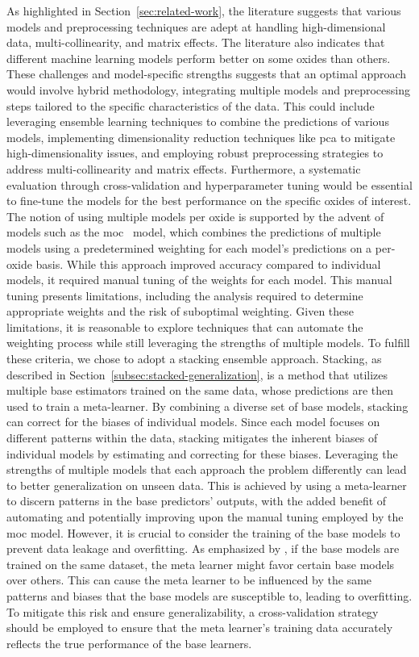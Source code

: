 As highlighted in Section~\ref{sec:related-work}, the literature suggests that various models and preprocessing techniques are adept at handling high-dimensional data, multi-collinearity, and matrix effects.
The literature also indicates that different machine learning models perform better on some oxides than others.
These challenges and model-specific strengths suggests that an optimal approach would involve hybrid methodology, integrating multiple models and preprocessing steps tailored to the specific characteristics of the data.
This could include leveraging ensemble learning techniques to combine the predictions of various models, implementing dimensionality reduction techniques like \gls{pca} to mitigate high-dimensionality issues, and employing robust preprocessing strategies to address multi-collinearity and matrix effects.
Furthermore, a systematic evaluation through cross-validation and hyperparameter tuning would be essential to fine-tune the models for the best performance on the specific oxides of interest.
The notion of using multiple models per oxide is supported by the advent of models such as the \gls{moc}~\cite{cleggRecalibrationMarsScience2017} model, which combines the predictions of multiple models using a predetermined weighting for each model's predictions on a per-oxide basis.
While this approach improved accuracy compared to individual models, it required manual tuning of the weights for each model.
This manual tuning presents limitations, including the analysis required to determine appropriate weights and the risk of suboptimal weighting.
Given these limitations, it is reasonable to explore techniques that can automate the weighting process while still leveraging the strengths of multiple models.
To fulfill these criteria, we chose to adopt a stacking ensemble approach.
Stacking, as described in Section~\ref{subsec:stacked-generalization}, is a method that utilizes multiple base estimators trained on the same data, whose predictions are then used to train a meta-learner.
By combining a diverse set of base models, stacking can correct for the biases of individual models.
Since each model focuses on different patterns within the data, stacking mitigates the inherent biases of individual models by estimating and correcting for these biases.
Leveraging the strengths of multiple models that each approach the problem differently can lead to better generalization on unseen data.
This is achieved by using a meta-learner to discern patterns in the base predictors' outputs\cite{wolpertstacked_1992, survey_of_ensemble_learning}, with the added benefit of automating and potentially improving upon the manual tuning employed by the \gls{moc} model.
However, it is crucial to consider the training of the base models to prevent data leakage and overfitting.
As emphasized by \citet{cvstacking}, if the base models are trained on the same dataset, the meta learner might favor certain base models over others.
This can cause the meta learner to be influenced by the same patterns and biases that the base models are susceptible to, leading to overfitting.
To mitigate this risk and ensure generalizability, a cross-validation strategy should be employed to ensure that the meta learner's training data accurately reflects the true performance of the base learners.

